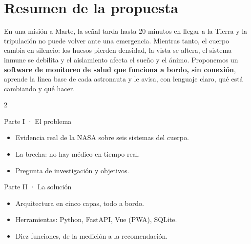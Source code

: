 \documentclass[11pt,a4paper]{article}
\begin{document}
\section*{Resumen de la propuesta}

En una misión a Marte, la señal tarda hasta 20 minutos en llegar a la Tierra y la tripulación no puede volver ante una emergencia. Mientras tanto, el cuerpo cambia en silencio: los huesos pierden densidad, la vista se altera, el sistema inmune se debilita y el aislamiento afecta el sueño y el ánimo. Proponemos un \textbf{software de monitoreo de salud que funciona a bordo, sin conexión}, aprende la línea base de cada astronauta y le avisa, con lenguaje claro, qué está cambiando y qué hacer.

\vspace{0.4em}
\begin{multicols}{2}
\begin{keybox}{Parte I · El problema}
\begin{itemize}[leftmargin=1.1em]
  \item Evidencia real de la NASA sobre seis sistemas del cuerpo.
  \item La brecha: no hay médico en tiempo real.
  \item Pregunta de investigación y objetivos.
\end{itemize}
\end{keybox}
\columnbreak
\begin{keybox}{Parte II · La solución}
\begin{itemize}[leftmargin=1.1em]
  \item Arquitectura en cinco capas, todo a bordo.
  \item Herramientas: Python, FastAPI, Vue (PWA), SQLite.
  \item Diez funciones, de la medición a la recomendación.
\end{itemize}
\end{keybox}
\end{multicols}
\end{document}
